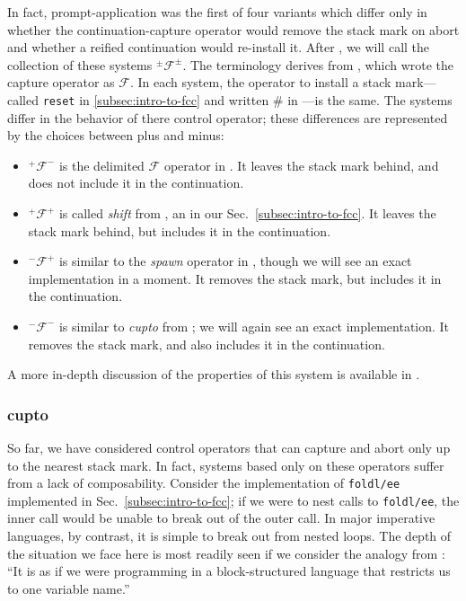 \documentclass[11pt]{article}
\newcommand\F{\mathcal{F}}
\newcommand\pmFpm{^\pm\F^\pm}
\begin{document}
In fact, prompt-application was the first of four variants which differ only in whether the continuation-capture operator would remove the stack mark on abort and whether a reified continuation would re-install it.
After \cite{MFDC}, we will call the collection of these systems $\pmFpm$.
The terminology derives from \cite{PromptApplication}, which wrote the capture operator as $\mathcal{F}$.
In each system, the operator to install a stack mark---called \texttt{reset} in \ref{subsec:intro-to-fcc} and written $\#$ in \cite{PromptApplication}---is the same.
The systems differ in the behavior of there control operator; these differences are represented by the choices between plus and minus:
\begin{itemize}
\item $^+\mathcal{F}^-$ is the delimited $\mathcal{F}$ operator in \cite{PromptApplication}. It leaves the stack mark behind, and does not include it in the continuation.
\item $^+\mathcal{F}^+$ is called \emph{shift} from \cite{AbstractingControl}, an in our Sec.~\ref{subsec:intro-to-fcc}. It leaves the stack mark behind, but includes it in the continuation.

\item $^-\mathcal{F}^+$ is similar to the \emph{spawn} operator in \cite{ContinuationsAndConcurrency}, though we will see an exact implementation in a moment. It removes the stack mark, but includes it in the continuation.
\item $^-\mathcal{F}^-$ is similar to \emph{cupto} from \cite{Gunter:1995}; we will again see an exact implementation. It removes the stack mark, and also includes it in the continuation.
\end{itemize}
A more in-depth discussion of the properties of this system is available in \cite{MFDC}.

\subsubsection{cupto}

So far, we have considered control operators that can capture and abort only up to the nearest stack mark.
In fact, systems based only on these operators suffer from a lack of composability.
Consider the implementation of \texttt{foldl/ee} implemented in Sec.~\ref{subsec:intro-to-fcc}; if we were to nest calls to \texttt{foldl/ee}, the inner call would be unable to break out of the outer call.
In major imperative languages, by contrast, it is simple to break out from nested loops.
The depth of the situation we face here is most readily seen if we consider the analogy from \cite{ContinuationsAndConcurrency}: ``It is as if we were programming in a block-structured language that restricts us to one variable name.''
\end{document}
